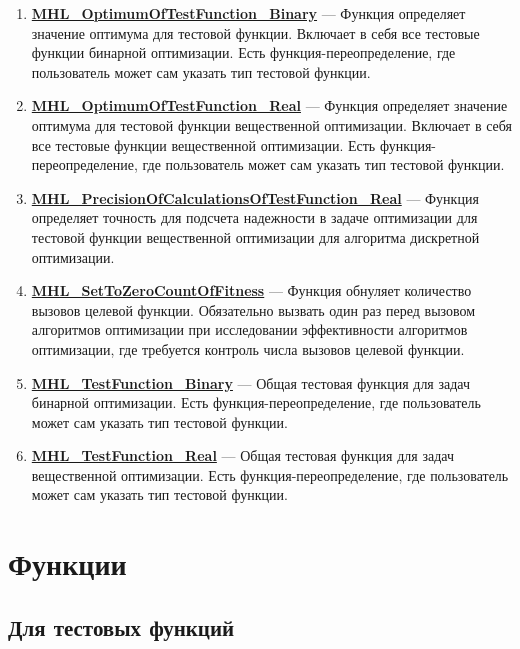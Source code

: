 \documentclass[a4paper,12pt]{article}
\begin{document}
\begin{enumerate}
\item \textbf{\hyperref[MHL_OptimumOfTestFunction_Binary]{MHL\_OptimumOfTestFunction\_Binary}} --- Функция определяет значение оптимума для тестовой функции. Включает в себя все тестовые функции бинарной оптимизации. Есть функция-переопределение, где пользователь может сам указать тип тестовой функции.

\item \textbf{\hyperref[MHL_OptimumOfTestFunction_Real]{MHL\_OptimumOfTestFunction\_Real}} --- Функция определяет значение оптимума для тестовой функции вещественной оптимизации. Включает в себя все тестовые функции вещественной оптимизации. Есть функция-переопределение, где пользователь может сам указать тип тестовой функции.

\item \textbf{\hyperref[MHL_PrecisionOfCalculationsOfTestFunction_Real]{MHL\_PrecisionOfCalculationsOfTestFunction\_Real}} --- Функция определяет точность для подсчета надежности в задаче оптимизации для тестовой функции вещественной оптимизации для алгоритма дискретной оптимизации.

\item \textbf{\hyperref[MHL_SetToZeroCountOfFitness]{MHL\_SetToZeroCountOfFitness}} --- Функция обнуляет количество вызовов целевой функции. Обязательно вызвать один раз перед вызовом алгоритмов оптимизации при исследовании эффективности    алгоритмов оптимизации, где требуется контроль числа вызовов целевой функции.

\item \textbf{\hyperref[MHL_TestFunction_Binary]{MHL\_TestFunction\_Binary}} --- Общая тестовая функция для задач бинарной оптимизации. Есть функция-переопределение, где пользователь может сам указать тип тестовой функции.

\item \textbf{\hyperref[MHL_TestFunction_Real]{MHL\_TestFunction\_Real}} --- Общая тестовая функция для задач вещественной оптимизации. Есть функция-переопределение, где пользователь может сам указать тип тестовой функции.

\end{enumerate}


\newpage
\section{Функции}
\subsection{Для тестовых функций}
\end{document}
